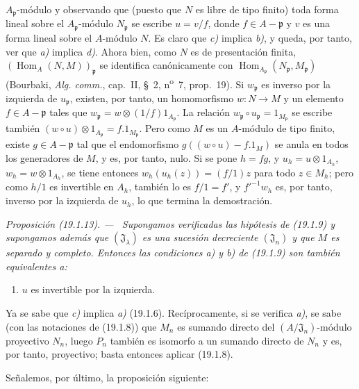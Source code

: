 \documentclass[10pt,oneside]{book}
\makeatletter
\newcommand{\setmanualcurrentlabel}[1]{\def\@currentlabel{#1}}
\newenvironment{proposition}[1][]{%
  \setmanualcurrentlabel{#1}\par\medskip\noindent\itshape Proposición (#1). ---\ }{\par}
\providecommand{\setmin}{-}%
\makeatother
\begin{document}
$A_{\mathfrak p}$-módulo y observando que (puesto que $N$ es libre de tipo
finito) toda forma lineal sobre el $A_{\mathfrak p}$-módulo
$N_{\mathfrak p}$ se escribe $u=v/f$, donde $f\in A\setmin\mathfrak p$ y $v$ es una
forma lineal sobre el $A$-módulo $N$. Es claro que \emph{c)} implica \emph{b)}, y queda, por
tanto, ver que \emph{a)} implica \emph{d)}. Ahora bien, como $N$ es de presentación finita,
$(\operatorname{Hom}_A(N,M))_{\mathfrak p}$ se identifica canónicamente con
$\operatorname{Hom}_{A_{\mathfrak p}}(N_{\mathfrak p},M_{\mathfrak p})$
(Bourbaki, \emph{Alg. comm.}, cap.~II, §~2, n\textsuperscript{o}~7,
prop.~19). Si $w_{\mathfrak p}$ es inverso por la izquierda de $u_{\mathfrak p}$,
existen, por tanto, un homomorfismo $w:N\to M$ y un elemento $f\in A\setmin\mathfrak p$ tales que
$w_{\mathfrak p}=w\otimes(1/f)1_{A_{\mathfrak p}}$. La relación
$w_{\mathfrak p}\circ u_{\mathfrak p}=1_{M_{\mathfrak p}}$ se escribe también
$(w\circ u)\otimes1_{A_{\mathfrak p}}=f.1_{M_{\mathfrak p}}$. Pero como $M$
es un $A$-módulo de tipo finito, existe $g\in A\setmin\mathfrak p$ tal que el
endomorfismo $g((w\circ u)\setmin f.1_M)$ se anula en todos los generadores de $M$, y
es, por tanto, nulo. Si se pone $h=fg$, y
$u_h=u\otimes1_{A_h}$, $w_h=w\otimes1_{A_h}$, se tiene entonces
$w_h(u_h(z))=(f/1)z$ para todo $z\in M_h$; pero como $h/1$ es invertible en
$A_h$, también lo es $f/1=f'$, y $f'^{-1}w_h$ es, por tanto, inverso por la
izquierda de $u_h$, lo que termina la demostración.

\begin{proposition}[19.1.13]
\label{0.19.1.13-es}
Supongamos verificadas las hipótesis de \textup{(19.1.9)} y supongamos además que
$(\mathfrak J_\lambda)$ es una sucesión decreciente $(\mathfrak J_n)$ y que $M$
es separado y completo. Entonces las condiciones \textup{a)} y \textup{b)} de \textup{(19.1.9)} son
también equivalentes a:
\begin{enumerate}
  \item[\textup{c)}] $u$ es invertible por la izquierda.
\end{enumerate}
\end{proposition}

Ya se sabe que \emph{c)} implica \emph{a)} (19.1.6). Recíprocamente, si se verifica \emph{a)}, se
sabe (con las notaciones de (19.1.8)) que $M_n$ es sumando directo del
$(A/\mathfrak J_n)$-módulo proyectivo $N_n$, luego $P_n$ también es isomorfo a
un sumando directo de $N_n$ y es, por tanto, proyectivo; basta entonces aplicar
(19.1.8).

Señalemos, por último, la proposición siguiente:
\end{document}
